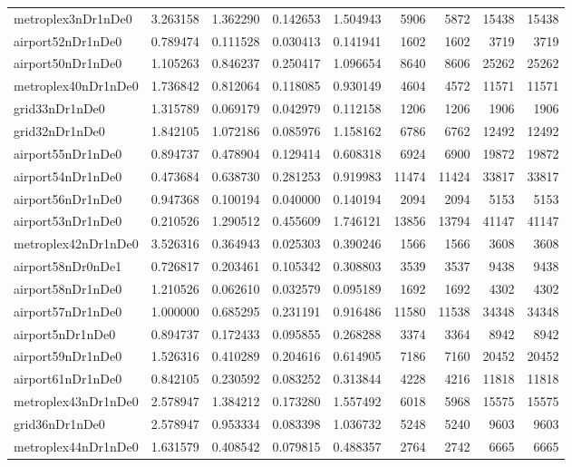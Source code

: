 \begin{longtable}{|l|r|r|r|r|r|r|r|r|}
metroplex3nDr1nDe0 & 3.263158 & 1.362290 & 0.142653 & 1.504943 & 5906 & 5872 & 15438 & 15438 \\
airport52nDr1nDe0 & 0.789474 & 0.111528 & 0.030413 & 0.141941 & 1602 & 1602 & 3719 & 3719 \\
airport50nDr1nDe0 & 1.105263 & 0.846237 & 0.250417 & 1.096654 & 8640 & 8606 & 25262 & 25262 \\
metroplex40nDr1nDe0 & 1.736842 & 0.812064 & 0.118085 & 0.930149 & 4604 & 4572 & 11571 & 11571 \\
grid33nDr1nDe0 & 1.315789 & 0.069179 & 0.042979 & 0.112158 & 1206 & 1206 & 1906 & 1906 \\
grid32nDr1nDe0 & 1.842105 & 1.072186 & 0.085976 & 1.158162 & 6786 & 6762 & 12492 & 12492 \\
airport55nDr1nDe0 & 0.894737 & 0.478904 & 0.129414 & 0.608318 & 6924 & 6900 & 19872 & 19872 \\
airport54nDr1nDe0 & 0.473684 & 0.638730 & 0.281253 & 0.919983 & 11474 & 11424 & 33817 & 33817 \\
airport56nDr1nDe0 & 0.947368 & 0.100194 & 0.040000 & 0.140194 & 2094 & 2094 & 5153 & 5153 \\
airport53nDr1nDe0 & 0.210526 & 1.290512 & 0.455609 & 1.746121 & 13856 & 13794 & 41147 & 41147 \\
metroplex42nDr1nDe0 & 3.526316 & 0.364943 & 0.025303 & 0.390246 & 1566 & 1566 & 3608 & 3608 \\
airport58nDr0nDe1 & 0.726817 & 0.203461 & 0.105342 & 0.308803 & 3539 & 3537 & 9438 & 9438 \\
airport58nDr1nDe0 & 1.210526 & 0.062610 & 0.032579 & 0.095189 & 1692 & 1692 & 4302 & 4302 \\
airport57nDr1nDe0 & 1.000000 & 0.685295 & 0.231191 & 0.916486 & 11580 & 11538 & 34348 & 34348 \\
airport5nDr1nDe0 & 0.894737 & 0.172433 & 0.095855 & 0.268288 & 3374 & 3364 & 8942 & 8942 \\
airport59nDr1nDe0 & 1.526316 & 0.410289 & 0.204616 & 0.614905 & 7186 & 7160 & 20452 & 20452 \\
airport61nDr1nDe0 & 0.842105 & 0.230592 & 0.083252 & 0.313844 & 4228 & 4216 & 11818 & 11818 \\
metroplex43nDr1nDe0 & 2.578947 & 1.384212 & 0.173280 & 1.557492 & 6018 & 5968 & 15575 & 15575 \\
grid36nDr1nDe0 & 2.578947 & 0.953334 & 0.083398 & 1.036732 & 5248 & 5240 & 9603 & 9603 \\
metroplex44nDr1nDe0 & 1.631579 & 0.408542 & 0.079815 & 0.488357 & 2764 & 2742 & 6665 & 6665 \\

\end{longtable}
